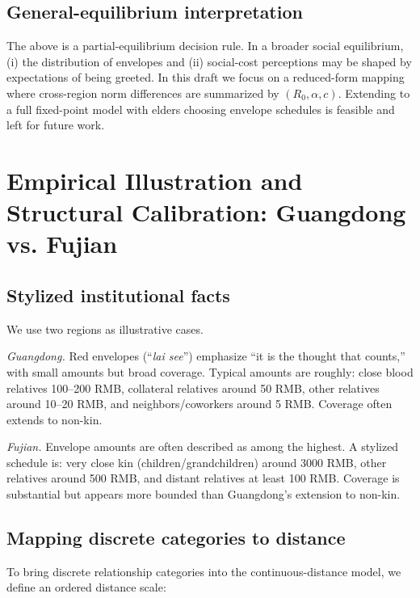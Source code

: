 \documentclass[AER]{AEA}
\begin{document}
\subsection{General-equilibrium interpretation}
The above is a partial-equilibrium decision rule. In a broader social equilibrium, (i) the distribution of envelopes and (ii) social-cost perceptions may be shaped by expectations of being greeted. In this draft we focus on a reduced-form mapping where cross-region norm differences are summarized by $(R_0,\alpha,c)$. Extending to a full fixed-point model with elders choosing envelope schedules is feasible and left for future work.

\section{Empirical Illustration and Structural Calibration: Guangdong vs. Fujian}

\subsection{Stylized institutional facts}
We use two regions as illustrative cases.

\textit{Guangdong.} Red envelopes (``\textit{lai see}'') emphasize ``it is the thought that counts,'' with small amounts but broad coverage. Typical amounts are roughly: close blood relatives 100--200 RMB, collateral relatives around 50 RMB, other relatives around 10--20 RMB, and neighbors/coworkers around 5 RMB. Coverage often extends to non-kin.

\textit{Fujian.} Envelope amounts are often described as among the highest. A stylized schedule is: very close kin (children/grandchildren) around 3000 RMB, other relatives around 500 RMB, and distant relatives at least 100 RMB. Coverage is substantial but appears more bounded than Guangdong's extension to non-kin.

\subsection{Mapping discrete categories to distance}
To bring discrete relationship categories into the continuous-distance model, we define an ordered distance scale:
\end{document}
